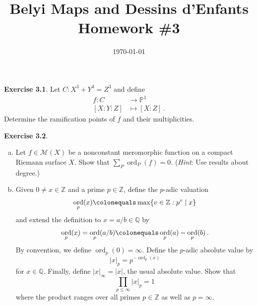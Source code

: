 \documentclass[12pt]{amsart}
\newenvironment{exolab}[1]
{\noindent\textbf{Exercise #1}.}
{\vskip 6pt}
\theoremstyle{remark}
\renewcommand{\P}{\mathbb P}
\newcommand{\Q}{\mathbb Q}
\newcommand{\Z}{\mathbb Z}
\DeclareMathOperator{\ord}{ord}
\begin{document}
\title{Belyi Maps and Dessins d'Enfants \\ Homework \#3}
\date{\today}


\maketitle

\begin{exolab}{3.1}
  Let $C: X^3 + Y^3 = Z^3$ and define
  \begin{align*}
    f: C &\to \P^1\\
    [X:Y:Z] &\mapsto [X:Z] \, .
  \end{align*}
  Determine the ramification points of $f$ and their multiplicities.
\end{exolab}

\begin{exolab}{3.2}
  \begin{enumerate}[(a)]
    \item 
      Let $f \in \mathcal{M}(X)$ be a nonconstant meromorphic function on a compact Riemann surface $X$. Show that $\sum_P \ord_P(f) = 0$. (\textit{Hint}: Use results about degree.)
    \item
      Given $0 \neq x \in \Z$ and a prime $p \in \Z$, define the \textsf{$p$-adic valuation}
      \begin{equation*}
        \ord_p(x) \colonequals \max\{v \in \Z : p^v \mid x\}
      \end{equation*}
      and extend the definition to $x = a/b \in \Q$ by
      \begin{equation*}
        \ord_p(x) = \ord_p(a/b) \colonequals \ord_p(a) - \ord_p(b) \, .
      \end{equation*}
      By convention, we define $\ord_p(0) = \infty$. Define the \textsf{$p$-adic absolute value} by
      \begin{equation*}
        |x|_p = p^{-\ord_p(x)}
      \end{equation*}
      for $x \in \Q$. Finally, define $|x|_\infty = |x|$, the usual absolute value. Show that
      \begin{equation*}
        \prod_{p \leq \infty} |x|_p = 1
      \end{equation*}
      where the product ranges over all primes $p \in \Z$ as well as $p = \infty$.
  \end{enumerate}
\end{exolab}
\end{document}
